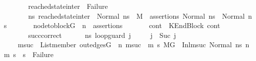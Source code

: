 \begin{isabellebody}
\ \ \ \ \ \ \ reached{\isacharunderscore}{\kern0pt}state{\isacharunderscore}{\kern0pt}inter\ {\isasymnoteq}\ Failure\ {\isasymand}\ \isanewline
\ \ \ \ \ \ \ {\isacharparenleft}{\kern0pt}{\isasymforall}ns{}{\isacharprime}{\kern0pt}{\isachardot}{\kern0pt}\ reached{\isacharunderscore}{\kern0pt}state{\isacharunderscore}{\kern0pt}inter\ {\isacharequal}{\kern0pt}\ Normal\ ns{}{\isacharprime}{\kern0pt}\ {\isasymlongrightarrow}\ {\isacharparenleft}{\kern0pt}M{\isacharcomma}{\kern0pt}{\isasymLambda}{\isacharcomma}{\kern0pt}{\isasymGamma}{\isacharcomma}{\kern0pt}{\isasymOmega}\ {\isasymturnstile}\ {\isasymlangle}assertions{\isacharcomma}{\kern0pt}\ Normal\ ns{}{\isasymrangle}\ {\isacharbrackleft}{\kern0pt}{\isasymrightarrow}{\isacharbrackright}{\kern0pt}\ Normal\ ns{}{\isacharprime}{\kern0pt}{\isacharparenright}{\kern0pt}{\isacharparenright}{\kern0pt}{\isachardoublequoteclose}\isanewline
\ \ \ \ \ \ \ {\isachardoublequoteopen}node{\isacharunderscore}{\kern0pt}to{\isacharunderscore}{\kern0pt}block{\isacharparenleft}{\kern0pt}G{\isacharparenright}{\kern0pt}\ {\isacharbang}{\kern0pt}\ n\ {\isacharequal}{\kern0pt}\ assertions{\isachardoublequoteclose}\isanewline
\ \ \ \ \ \ \ {\isachardoublequoteopen}cont{}\ {\isacharequal}{\kern0pt}\ KEndBlock\ cont{}{\isachardoublequoteclose}\isanewline
\ \ \ \ \ \ \ succ{\isacharunderscore}{\kern0pt}correct{\isacharcolon}{\kern0pt}\ \isanewline
\ \ \ \ {\isachardoublequoteopen}{\isasymAnd}\ ns{}{\isacharprime}{\kern0pt}{\isacharprime}{\kern0pt}\ loop{\isacharunderscore}{\kern0pt}guard\ j{\isacharprime}{\kern0pt}{\isachardot}{\kern0pt}\ \isanewline
\ \ \ \ j\ {\isacharequal}{\kern0pt}\ Suc\ j{\isacharprime}{\kern0pt}\ {\isasymLongrightarrow}\isanewline
\ \ \ \ {\isacharparenleft}{\kern0pt}{\isasymforall}msuc{}{\isachardot}{\kern0pt}\ \ List{\isachardot}{\kern0pt}member\ {\isacharparenleft}{\kern0pt}out{\isacharunderscore}{\kern0pt}edges{\isacharparenleft}{\kern0pt}G{\isacharparenright}{\kern0pt}\ {\isacharbang}{\kern0pt}\ n{\isacharparenright}{\kern0pt}\ msuc{}\ {\isasymlongrightarrow}\ {\isacharparenleft}{\kern0pt}{\isasymforall}m{}\ s{}{\isachardot}{\kern0pt}\ {\isacharparenleft}{\kern0pt}{\isacharparenleft}{\kern0pt}M{\isacharcomma}{\kern0pt}{\isasymLambda}{\isacharcomma}{\kern0pt}{\isasymGamma}{\isacharcomma}{\kern0pt}{\isasymOmega}{\isacharcomma}{\kern0pt}G\ {\isasymturnstile}\ {\isacharparenleft}{\kern0pt}Inl{\isacharparenleft}{\kern0pt}msuc{}{\isacharparenright}{\kern0pt}{\isacharcomma}{\kern0pt}\ Normal\ ns{}{\isacharprime}{\kern0pt}{\isacharprime}{\kern0pt}{\isacharparenright}{\kern0pt}\ {\isacharminus}{\kern0pt}n{\isasymrightarrow}{\isacharasterisk}{\kern0pt}\ {\isacharparenleft}{\kern0pt}m{}{\isacharcomma}{\kern0pt}\ s{}{\isacharparenright}{\kern0pt}{\isacharparenright}{\kern0pt}\ {\isasymlongrightarrow}\ s{}\ {\isasymnoteq}\ Failure{\isacharparenright}{\kern0pt}{\isacharparenright}{\kern0pt}{\isacharparenright}{\kern0pt}\ {\isasymLongrightarrow}\isanewline

\end{isabellebody}
